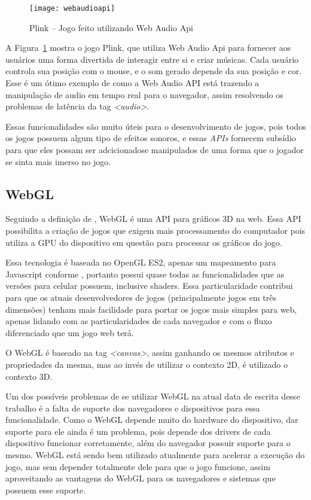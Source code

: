 \begin{figure}[H]
  \centering
	\texttt{[image: webaudioapi]}
  \caption{Plink {--} Jogo feito utilizando Web Audio Api}
  \label{img:webaudioapi}
\end{figure}

A Figura~\ref{img:webaudioapi} mostra o jogo Plink, que utiliza Web
Audio Api para fornecer aos usuários uma forma divertida de interagir
entre si e criar músicas. Cada usuário controla sua posição com o
mouse, e o som gerado depende da sua posição e cor. Esse é um ótimo
exemplo de como a Web Audio API está trazendo a manipulação de audio
em tempo real para o navegador, assim resolvendo os problemas de
latência da tag \textit{<audio>}.

Essas funcionalidades são muito úteis para o desenvolvimento de jogos, pois
todos os jogos possuem algum tipo de efeitos sonoros, e essas
\textit{APIs} fornecem subsídio para que eles possam ser adcicionadose
manipulados de uma forma que o jogador se sinta mais imerso no jogo.

\subsection{WebGL}

Seguindo a definição de , WebGL é uma API para gráficos 3D na web. Essa
API possibilita a criação de jogos que exigem mais processamento do
computador pois utiliza a GPU do dispositivo em questão para processar
os gráficos do jogo.

Essa tecnologia é baseada no OpenGL ES2, apenas um mapeamento para
Javascript conforme , portanto possui
quase todas as funcionalidades que as versões para celular possuem,
inclusive shaders. Essa particularidade contribui
para que os atuais desenvolvedores de jogos (principalmente jogos em
três dimensões) tenham mais facilidade para portar os jogos mais
simples para web, apenas lidando com as particularidades de cada
navegador e com o fluxo diferenciado que um jogo web terá.

O WebGL é baseado na tag \textit{<canvas>}, assim ganhando os mesmos
atributos e propriedades da mesma, mas ao invés de utilizar o contexto
2D, é utilizado o contexto 3D.

Um dos possíveis problemas de se utilizar WebGL na atual data
de escrita desse trabalho é a falta de suporte dos navegadores e
dispositivos para essa funcionalidade. Como o WebGL depende muito do
hardware do dispositivo, dar suporte para ele ainda é um problema,
pois depende dos drivers de cada dispositivo funcionar
corretamente, além do navegador possuir suporte para o mesmo.
WebGL está sendo bem utilizado atualmente para acelerar a execução do jogo,
mas sem depender totalmente dele para que o jogo funcione, assim
aproveitando as vantagens do WebGL para os navegadores e sistemas que
possuem esse suporte.

